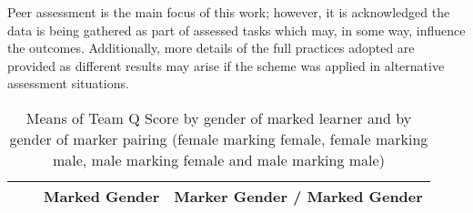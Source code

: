 \documentclass[sigconf, anonymous=true]{acmart}
\begin{document}
Peer assessment is the main focus of this work; however, it is
acknowledged the data is being gathered as part of assessed tasks
which may, in some way, influence the outcomes. Additionally, more
details of the full practices adopted are provided as different
results may arise if the scheme was applied in alternative assessment
situations.

\begin{table*}[ht]
	\caption{Means of Team Q Score by gender of marked learner and by gender of marker pairing (female marking female, female marking male, male marking female and male marking male)}
	\begin{tabular} {| p{2cm} | p{7cm} | p{1cm}| p{1cm} | p{1cm}| p{1cm} |p{1cm} |p{1cm} |} 
		\hline
		
		& & \multicolumn{2}{c}{Marked Gender}& \multicolumn{4}{c}{Marker Gender  / Marked Gender }  \\
		\hline
		
		
		

\end{tabular}
\end{table*}
\end{document}
